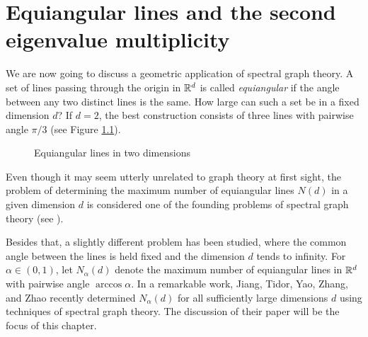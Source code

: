 \chapter{Equiangular lines and the second eigenvalue multiplicity}

We are now going to discuss a geometric application of spectral graph theory.
A set of lines passing through the origin in $\mathbb{R}^d$ is called \textit{equiangular} if the angle between any two distinct lines is the same.
How large can such a set be in a fixed dimension $d$?
If $d = 2$, the best construction consists of three lines with pairwise angle $\pi /3$ (see Figure \ref{fig:equiangular-lines}).

\begin{figure}[ht]
    \centering
    \captionsetup{justification=centering, margin=2cm}
    \caption{Equiangular lines in two dimensions}
    \label{fig:equiangular-lines}
\end{figure}

Even though it may seem utterly unrelated to graph theory at first sight, the problem of determining the maximum number of equiangular lines $N(d)$ in a given dimension $d$ is considered one of the founding problems of spectral graph theory (see \mbox{\cite[Chapter 11]{godsilroyle})}.

Besides that, a slightly different problem has been studied, where the common angle between the lines is held fixed and the dimension $d$ tends to infinity.
For $\alpha \in (0, 1)$, let $N_\alpha (d)$ denote the maximum number of equiangular lines in $\mathbb{R}^d$ with pairwise angle $\arccos \alpha$.
In a remarkable work, Jiang, Tidor, Yao, Zhang, and Zhao recently determined $N_\alpha (d)$ for all sufficiently large dimensions $d$ using techniques of spectral graph theory. 
The discussion of their paper \cite{equiangular} will be the focus of this chapter.

